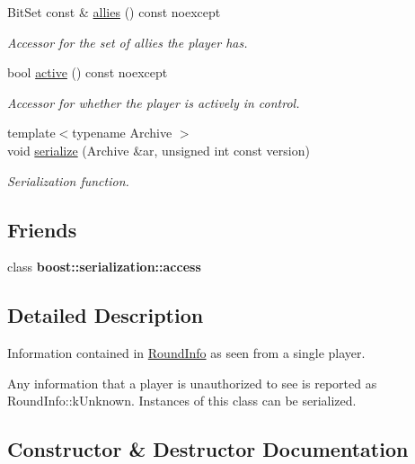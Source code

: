\begin{DoxyCompactItemize}
Bit\+Set const  \& \hyperlink{classroundinfo_1_1_round_info_view_af00b23d7a3f2fa21fd3cbba1f71e0fd4}{allies} () const noexcept
\begin{DoxyCompactList}\small\item\em Accessor for the set of allies the player has. \end{DoxyCompactList}\item 
bool \hyperlink{classroundinfo_1_1_round_info_view_a1ff1802f7ab8e24008f02bbc0169a160}{active} () const noexcept
\begin{DoxyCompactList}\small\item\em Accessor for whether the player is actively in control. \end{DoxyCompactList}\item 
{\footnotesize template$<$typename Archive $>$ }\\void \hyperlink{classroundinfo_1_1_round_info_view_a101e6ee624aacfa8dd110aea67e67538}{serialize} (Archive \&ar, unsigned int const version)
\begin{DoxyCompactList}\small\item\em Serialization function. \end{DoxyCompactList}\end{DoxyCompactItemize}
\subsection*{Friends}
\begin{DoxyCompactItemize}
\item 
\mbox{\label{classroundinfo_1_1_round_info_view_ac98d07dd8f7b70e16ccb9a01abf56b9c}} 
class {\bfseries boost\+::serialization\+::access}
\end{DoxyCompactItemize}


\subsection{Detailed Description}
Information contained in {\ttfamily \hyperlink{classroundinfo_1_1_round_info}{Round\+Info}} as seen from a single player. 

Any information that a player is unauthorized to see is reported as {\ttfamily Round\+Info\+::k\+Unknown}. Instances of this class can be serialized. 

\subsection{Constructor \& Destructor Documentation}
\mbox{\label{classroundinfo_1_1_round_info_view_a29937c9ac9cd71b7edd10f612ce76c91}} 
